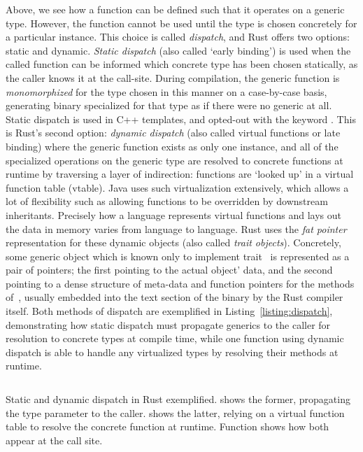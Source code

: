 Above, we see how a function can be defined such that it operates on a generic type. However, the function cannot be used until the type is chosen concretely for a particular instance. This choice is called \textit{dispatch}, and Rust offers two options: static and dynamic. \textit{Static dispatch} (also called `early binding') is used when the called function can be informed which concrete type has been chosen statically, as the caller knows it at the call-site. During compilation, the generic function is \textit{monomorphized} for the type chosen in this manner on a case-by-case basis, generating binary specialized for that type as if there were no generic at all. Static dispatch is used in C++ templates, and opted-out with the keyword . This is Rust's second option: \textit{dynamic dispatch} (also called virtual functions or late binding) where the generic function exists as only one instance, and all of the specialized operations on the generic type are resolved to concrete functions at runtime by traversing a layer of indirection: functions are `looked up' in a virtual function table (vtable). Java uses such virtualization extensively, which allows a lot of flexibility such as allowing functions to be overridden by downstream inheritants. Precisely how a language represents virtual functions and lays out the data in memory varies from language to language. Rust uses the \textit{fat pointer} representation for these dynamic objects (also called \textit{trait objects}). Concretely, some generic object which is known only to implement trait~ is represented as a pair of pointers; the first pointing to the actual object' data, and the second pointing to a dense structure of meta-data and function pointers for the methods of~, usually embedded into the text section of the binary by the Rust compiler itself. Both methods of dispatch are exemplified in Listing~\ref{listing:dispatch}, demonstrating how static dispatch must propagate generics to the caller for resolution to concrete types at compile time, while one function using dynamic dispatch is able to handle any virtualized types by resolving their methods at runtime.


\begin{listing}[ht]
	\centering
	\inputminted{rust}{dispatch.rs}
	\caption[Static vs dynamic dispatch in Rust.]{Static and dynamic dispatch in Rust exemplified.  shows the former, propagating the type parameter to the caller.  shows the latter, relying on a virtual function table to resolve the concrete function at runtime. Function  shows how both appear at the call site.}
	\label{listing:dispatch}
\end{listing}


